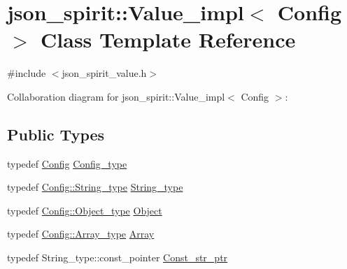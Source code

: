 \hypertarget{classjson__spirit_1_1_value__impl}{}\section{json\+\_\+spirit\+:\+:Value\+\_\+impl$<$ Config $>$ Class Template Reference}
\label{classjson__spirit_1_1_value__impl}


{\ttfamily \#include $<$json\+\_\+spirit\+\_\+value.\+h$>$}



Collaboration diagram for json\+\_\+spirit\+:\+:Value\+\_\+impl$<$ Config $>$\+:
\subsection*{Public Types}
\begin{DoxyCompactItemize}
\item 
typedef \hyperlink{namespacejson__spirit_aaf9079ef41a2fa7db0861c24b89d4254}{Config} \hyperlink{classjson__spirit_1_1_value__impl_a5dc93efdb2aae96d96c9fedf37ace554}{Config\+\_\+type}
\item 
typedef \hyperlink{structjson__spirit_1_1_config__vector_a9f0a96da6042290c5bc25c1b3269e747}{Config\+::\+String\+\_\+type} \hyperlink{classjson__spirit_1_1_value__impl_a7af638128a4e0dd86ab33c989c3e5ebf}{String\+\_\+type}
\item 
typedef \hyperlink{structjson__spirit_1_1_config__vector_a070c3d1a0aea6da7c24a60400d52f15d}{Config\+::\+Object\+\_\+type} \hyperlink{classjson__spirit_1_1_value__impl_ac4467b91c71f897bab0c6d74864ae991}{Object}
\item 
typedef \hyperlink{structjson__spirit_1_1_config__vector_af33059c26ec27a5153b53dd4bd312815}{Config\+::\+Array\+\_\+type} \hyperlink{classjson__spirit_1_1_value__impl_a8cbad4704c204a3421817f08a0b44dd6}{Array}
\item 
typedef String\+\_\+type\+::const\+\_\+pointer \hyperlink{classjson__spirit_1_1_value__impl_ae789c7abc9da932853db9493ddbe6101}{Const\+\_\+str\+\_\+ptr}
\end{DoxyCompactItemize}
